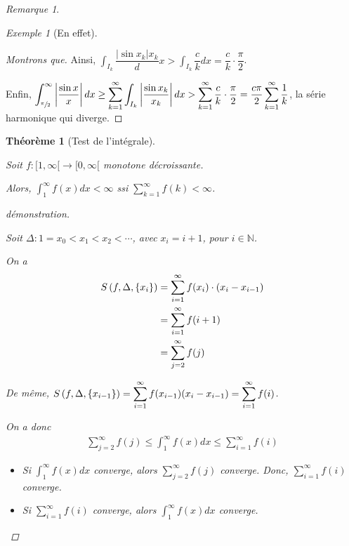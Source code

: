 \documentclass{report}
\newcommand*{\dsum}[4]{\displaystyle\sum_{#1=#2}^{#3}#4}
\newcommand*{\dint}[3]{\displaystyle\int_{#1}^{#2}#3}
\newcommand*{\abs}[1]{\left| #1 \right|}
\newcommand*{\naturels}{\mathbb{N}}
\newtheorem*{thm}{Th\'eor\`eme}
\theoremstyle{definition}
\theoremstyle{remark}
\newtheorem*{exem}{Exemple}
\newtheorem*{rema}{Remarque}
\begin{document}
\begin{rema}
\begin{exem}[En effet]
\begin{proof}[Montrons que]
				Ainsi, $\displaystyle\int_{I_k} \dfrac{\abs{\sin x_k}{x_k}} dx >  \displaystyle\int_{I_k} \dfrac{c}{k} dx = \dfrac{c}{k} \cdot \dfrac{\pi}{2}$.

				Enfin, $\displaystyle\int_{\sfrac{\pi}{2}}^\infty \abs{\dfrac{\sin x}{x}} dx \geq \displaystyle\sum_{k=1}^{\infty} \displaystyle\int_{I_k} \abs{\dfrac{\sin x_k}{x_k}} dx > \displaystyle\sum_{k=1}^\infty \dfrac{c}{k} \cdot \dfrac{\pi}{2} = \dfrac{c\pi}{2} \displaystyle\sum_{k=1}^\infty \dfrac{1}{k}$, la s\'erie harmonique qui diverge.
			\end{proof}
		\end{exem}
	\end{rema}
	\begin{thm}[Test de l'int\'egrale]~

		Soit $f: [1,\infty[ \to [0,\infty[$ monotone d\'ecroissante.

		Alors, $\displaystyle\int_{1}^{\infty}f(x)dx < \infty$ ssi $\displaystyle\sum_{k=1}^{\infty} f(k) < \infty$.
		\begin{proof}[d\'emonstration]~

			Soit $\Delta: 1 = x_0 < x_1 < x_2 < \dotsb$, avec $x_i=i+1$, pour $i \in \naturels$.

			On a
			\begin{align*}
				\srie{f}[\Delta][\{x_i\}]&= \sum_{i=1}^{\infty} f(x_i) \cdot (x_i-x_{i-1})\\
				&= \sum_{i=1}^{\infty} f(i+1)\\
				&= \sum_{j=2}^{\infty} f(j)
			\end{align*}

			De m\^eme, $\srie{f}[\Delta][\{x_{i-1}\}] = \dsum{i}{1}{\infty}{f(x_{i-1})} (x_i-x_{i-1}) = \dsum{i}{1}{\infty}{f(i)}$.

			On a donc
			\begin{align*}
			\sum_{j=2}^\infty f(j) \leq \int_{1}^{\infty} f(x)dx \leq \sum_{i=1}^\infty f(i)
			\end{align*}
			\begin{itemize}
			\item[$(\Rightarrow)$] Si $\dint{1}{\infty}{f(x)dx}$ converge, alors $\dsum{j}{2}{\infty}{f(j)}$ converge. Donc, $\dsum{i}{1}{\infty}{f(i)}$ converge.
			\item[$(\Leftarrow)$] Si $\dsum{i}{1}{\infty}{f(i)}$ converge, alors $\dint{1}{\infty}{f(x)dx}$ converge.
			\end{itemize}
		\end{proof}
	\end{thm}
\end{document}
